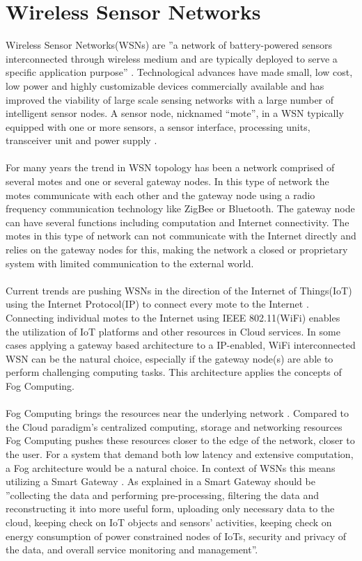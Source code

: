 \documentclass[]{uiophd}
\begin{document}
\section{Wireless Sensor Networks}
Wireless Sensor Networks(WSNs) are ''a network of battery-powered sensors interconnected through wireless medium and are typically deployed to serve a specific application purpose'' \cite{Ojha2015662}. Technological advances have made small, low cost, low power and highly customizable devices commercially available and has improved the viability of large scale sensing networks with a large number of intelligent sensor nodes. A sensor node, nicknamed “mote”, in a WSN typically equipped with one or more sensors, a sensor interface, processing units, transceiver unit and power supply \cite{Gubbi20131645}.
\\\\
For many years the trend in WSN topology has been a network comprised of several motes and one or several gateway nodes. In this type of network the motes communicate with each other and the gateway node using a radio frequency communication technology like ZigBee or Bluetooth. The gateway node can have several functions including computation and Internet connectivity. The motes in this type of network can not communicate with the Internet directly and relies on the gateway nodes for this, making the network a closed or proprietary system with limited communication to the external world. 
\\\\
Current trends are pushing WSNs in the direction of the Internet of Things(IoT) using the Internet Protocol(IP) to connect every mote to the Internet \cite{6064380}. Connecting individual motes to the Internet using IEEE 802.11(WiFi) enables the utilization of IoT platforms and other resources in Cloud services. In some cases applying a gateway based architecture to a IP-enabled, WiFi interconnected WSN can be the natural choice, especially if the gateway node(s) are able to perform challenging computing tasks. This architecture applies the concepts of Fog Computing.
\\\\
Fog Computing brings the resources near the underlying network \cite{6984239}. Compared to the Cloud paradigm's centralized computing, storage and networking resources Fog Computing pushes these resources closer to the edge of the network, closer to the user. For a system that demand both low latency and extensive computation, a Fog architecture would be a natural choice. In context of WSNs this means utilizing a Smart Gateway \cite{6984239}. As explained in \cite{69842392} a Smart Gateway should be ''collecting the data and performing pre-processing, filtering the data and reconstructing it into more useful form, uploading only necessary data to the cloud, keeping check on IoT objects and sensors’ activities, keeping check on energy consumption of power constrained nodes of IoTs, security and privacy of the data, and overall service monitoring and management''. 
\end{document}
